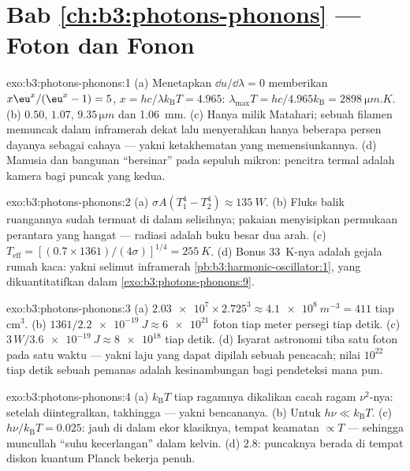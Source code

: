 \section*{Bab \ref{ch:b3:photons-phonons} --- Foton dan Fonon}

\begin{solution}{exo:b3:photons-phonons:1}
(a) Menetapkan $\dd u/\dd\lambda = 0$ memberikan $x\eu^x/(\eu^x - 1) = 5$,
$x = hc/\lambda k_{\text{B}}T = 4.965$: $\lambda_{\max}T =
hc/4.965k_{\text{B}} = \qty{2898}{\micro m.K}$. (b) $0.50$,
$1.07$, $9.35\,\unit{\micro m}$ dan \qty{1.06}{mm}. (c) Hanya milik
Matahari; sebuah filamen memuncak dalam inframerah dekat lalu menyerahkan
hanya beberapa persen dayanya sebagai cahaya --- yakni ketakhematan yang
memensiunkannya. (d) Manusia dan bangunan ``bersinar'' pada sepuluh
mikron: pencitra termal adalah kamera bagi puncak yang kedua.
\end{solution}

\begin{solution}{exo:b3:photons-phonons:2}
(a) $\sigma A(T_1^4 - T_2^4) \approx \qty{135}{W}$. (b) Fluks balik
ruangannya sudah termuat di dalam selisihnya; pakaian menyisipkan
permukaan perantara yang hangat --- radiasi adalah buku besar dua arah. (c)
$T_{\text{eff}} = [(0.7 \times 1361)/(4\sigma)]^{1/4} =
\qty{255}{K}$. (d) Bonus \qty{33}{K}-nya adalah gejala rumah kaca:
yakni selimut inframerah
\cref{pb:b3:harmonic-oscillator:1}, yang dikuantitatifkan dalam
\cref{exo:b3:photons-phonons:9}.
\end{solution}

\begin{solution}{exo:b3:photons-phonons:3}
(a) $\num{2.03e7} \times 2.725^3 \approx \qty{4.1e8}{m^{-3}} =
411$ tiap cm$^3$. (b) $1361/\qty{2.2e-19}{J} \approx
\num{6e21}$ foton tiap meter persegi tiap detik. (c) $3\,\unit{W}/
\qty{3.6e-19}{J} \approx \num{8e18}$ tiap detik. (d) Isyarat
astronomi tiba satu foton pada satu waktu --- yakni laju yang dapat
dipilah sebuah pencacah; nilai $10^{22}$ tiap detik sebuah pemanas
adalah kesinambungan bagi pendeteksi mana pun.
\end{solution}

\begin{solution}{exo:b3:photons-phonons:4}
(a) $k_{\text{B}}T$ tiap ragamnya dikalikan cacah ragam $\nu^2$-nya:
setelah diintegralkan, takhingga --- yakni bencananya. (b) Untuk $h\nu \ll
k_{\text{B}}T$. (c) $h\nu/k_{\text{B}}T = 0.025$: jauh di dalam
ekor klasiknya, tempat keamatan $\propto T$ --- sehingga muncullah
``suhu kecerlangan'' dalam kelvin. (d) $2.8$: puncaknya berada di
tempat diskon kuantum Planck bekerja penuh.
\end{solution}

